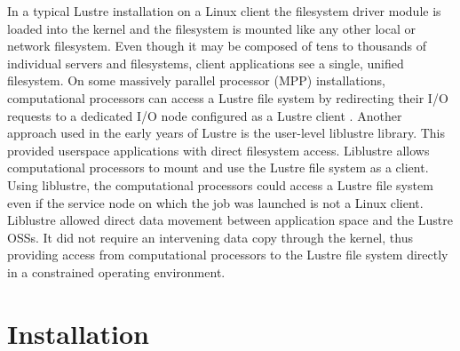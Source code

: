 \documentclass[9pt,twocolumn,twoside]{../../styles/osajnl}
\begin{document}
In a typical Lustre installation on a Linux client the filesystem
driver module is loaded into the kernel and the filesystem is mounted
like any other local or network filesystem. Even though it may be
composed of tens to thousands of individual servers and filesystems,
client applications see a single, unified filesystem. On some
massively parallel processor (MPP) installations, computational
processors can access a Lustre file system by redirecting their I/O
requests to a dedicated I/O node configured as a Lustre client
\cite{www-bluegene-wikipedia}. Another approach used in the early
years of Lustre is the user-level liblustre library. This provided
userspace applications with direct filesystem access. Liblustre allows
computational processors to mount and use the Lustre file system as a
client. Using liblustre, the computational processors could access a
Lustre file system even if the service node on which the job was
launched is not a Linux client. Liblustre allowed direct data movement
between application space and the Lustre OSSs. It did not require an
intervening data copy through the kernel, thus providing access from
computational processors to the Lustre file system directly in a
constrained operating environment.

\section{Installation}
\end{document}
